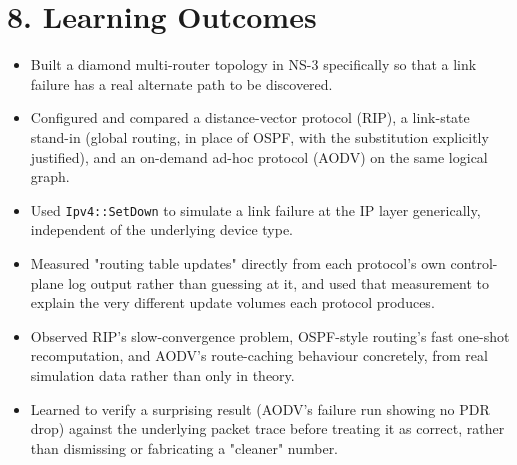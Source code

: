 \documentclass[11pt]{article}
\begin{document}
\section*{8. Learning Outcomes}
\begin{itemize}
  \item Built a diamond multi-router topology in NS-3 specifically so that a
        link failure has a real alternate path to be discovered.
  \item Configured and compared a distance-vector protocol (RIP), a
        link-state stand-in (global routing, in place of OSPF, with the
        substitution explicitly justified), and an on-demand ad-hoc protocol
        (AODV) on the same logical graph.
  \item Used \texttt{Ipv4::SetDown} to simulate a link failure at the IP
        layer generically, independent of the underlying device type.
  \item Measured "routing table updates" directly from each protocol's own
        control-plane log output rather than guessing at it, and used that
        measurement to explain the very different update volumes each
        protocol produces.
  \item Observed RIP's slow-convergence problem, OSPF-style routing's fast
        one-shot recomputation, and AODV's route-caching behaviour
        concretely, from real simulation data rather than only in theory.
  \item Learned to verify a surprising result (AODV's failure run showing no
        PDR drop) against the underlying packet trace before treating it as
        correct, rather than dismissing or fabricating a "cleaner" number.
\end{itemize}
\end{document}
